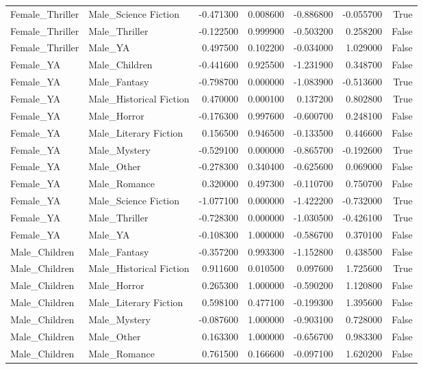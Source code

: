 \begin{tabular}{llrrrrr}
Female_Thriller & Male_Science Fiction & -0.471300 & 0.008600 & -0.886800 & -0.055700 & True \\
Female_Thriller & Male_Thriller & -0.122500 & 0.999900 & -0.503200 & 0.258200 & False \\
Female_Thriller & Male_YA & 0.497500 & 0.102200 & -0.034000 & 1.029000 & False \\
Female_YA & Male_Children & -0.441600 & 0.925500 & -1.231900 & 0.348700 & False \\
Female_YA & Male_Fantasy & -0.798700 & 0.000000 & -1.083900 & -0.513600 & True \\
Female_YA & Male_Historical Fiction & 0.470000 & 0.000100 & 0.137200 & 0.802800 & True \\
Female_YA & Male_Horror & -0.176300 & 0.997600 & -0.600700 & 0.248100 & False \\
Female_YA & Male_Literary Fiction & 0.156500 & 0.946500 & -0.133500 & 0.446600 & False \\
Female_YA & Male_Mystery & -0.529100 & 0.000000 & -0.865700 & -0.192600 & True \\
Female_YA & Male_Other & -0.278300 & 0.340400 & -0.625600 & 0.069000 & False \\
Female_YA & Male_Romance & 0.320000 & 0.497300 & -0.110700 & 0.750700 & False \\
Female_YA & Male_Science Fiction & -1.077100 & 0.000000 & -1.422200 & -0.732000 & True \\
Female_YA & Male_Thriller & -0.728300 & 0.000000 & -1.030500 & -0.426100 & True \\
Female_YA & Male_YA & -0.108300 & 1.000000 & -0.586700 & 0.370100 & False \\
Male_Children & Male_Fantasy & -0.357200 & 0.993300 & -1.152800 & 0.438500 & False \\
Male_Children & Male_Historical Fiction & 0.911600 & 0.010500 & 0.097600 & 1.725600 & True \\
Male_Children & Male_Horror & 0.265300 & 1.000000 & -0.590200 & 1.120800 & False \\
Male_Children & Male_Literary Fiction & 0.598100 & 0.477100 & -0.199300 & 1.395600 & False \\
Male_Children & Male_Mystery & -0.087600 & 1.000000 & -0.903100 & 0.728000 & False \\
Male_Children & Male_Other & 0.163300 & 1.000000 & -0.656700 & 0.983300 & False \\
Male_Children & Male_Romance & 0.761500 & 0.166600 & -0.097100 & 1.620200 & False \\

\end{tabular}
